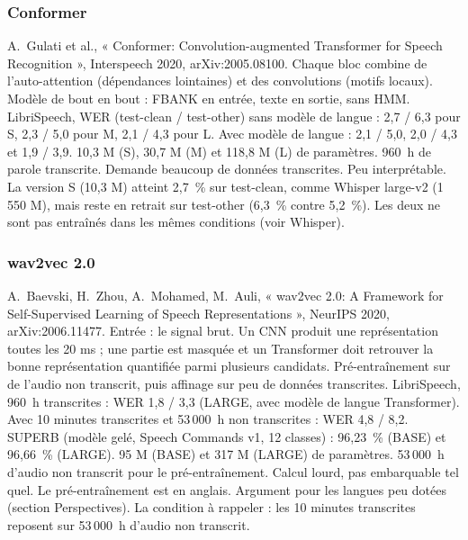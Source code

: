 \subsubsection*{Conformer}
\fichemodele
{A.~Gulati et al., « Conformer: Convolution-augmented Transformer for Speech Recognition », Interspeech 2020, arXiv:2005.08100.}
{Chaque bloc combine de l'auto-attention (dépendances lointaines) et des convolutions (motifs locaux). Modèle de bout en bout : FBANK en entrée, texte en sortie, sans HMM.}
{LibriSpeech, WER (test-clean / test-other) sans modèle de langue : 2,7 / 6,3 pour S, 2,3 / 5,0 pour M, 2,1 / 4,3 pour L. Avec modèle de langue : 2,1 / 5,0, 2,0 / 4,3 et 1,9 / 3,9.}
{10,3 M (S), 30,7 M (M) et 118,8 M (L) de paramètres. 960~h de parole transcrite.}
{Demande beaucoup de données transcrites. Peu interprétable.}
{La version S (10,3 M) atteint 2,7~\% sur test-clean, comme Whisper large-v2 (1\,550 M), mais reste en retrait sur test-other (6,3~\% contre 5,2~\%). Les deux ne sont pas entraînés dans les mêmes conditions (voir Whisper).}

\subsubsection*{wav2vec 2.0}
\fichemodele
{A.~Baevski, H.~Zhou, A.~Mohamed, M.~Auli, « wav2vec 2.0: A Framework for Self-Supervised Learning of Speech Representations », NeurIPS 2020, arXiv:2006.11477.}
{Entrée : le signal brut. Un CNN produit une représentation toutes les 20 ms ; une partie est masquée et un Transformer doit retrouver la bonne représentation quantifiée parmi plusieurs candidats. Pré-entraînement sur de l'audio non transcrit, puis affinage sur peu de données transcrites.}
{LibriSpeech, 960~h transcrites : WER 1,8 / 3,3 (LARGE, avec modèle de langue Transformer). Avec 10 minutes transcrites et 53\,000~h non transcrites : WER 4,8 / 8,2. SUPERB (modèle gelé, Speech Commands v1, 12 classes) : 96,23~\% (BASE) et 96,66~\% (LARGE).}
{95 M (BASE) et 317 M (LARGE) de paramètres. 53\,000~h d'audio non transcrit pour le pré-entraînement.}
{Calcul lourd, pas embarquable tel quel. Le pré-entraînement est en anglais.}
{Argument pour les langues peu dotées (section Perspectives). La condition à rappeler : les 10 minutes transcrites reposent sur 53\,000~h d'audio non transcrit.}


